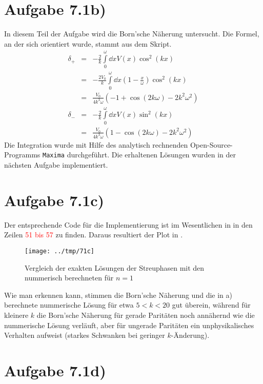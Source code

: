 \section*{Aufgabe 7.1b)}
In diesem Teil der Aufgabe wird die Born'sche Näherung untersucht. Die Formel, an
der sich orientiert wurde, stammt aus dem Skript.
\begin{eqnarray}
δ_+ &=& -\frac{2}{k}\int\limits_0^ω\dd{x}V(x)\cos^2(kx)\\
&=& -\frac{2 V_0}{k}\int\limits_0^ω\dd{x}(1-\frac{x}{ω})\cos^2(kx)\\
&=& \frac{V_0}{4k^3 ω} \left(-1 + \cos(2kω) - 2k^2 ω^2\right)\\
δ_- &=& -\frac{2}{k}\int\limits_0^ω\dd{x}V(x)\sin^2(kx)\\
&=& \frac{V_0}{4k^3 ω} \left(1 - \cos(2kω) - 2k^2 ω^2\right)
\end{eqnarray}
Die Integration wurde mit Hilfe des analytisch rechnenden Open-Source-Programms
\texttt{Maxima} durchgeführt. Die erhaltenen Lösungen wurden in der nächsten
Aufgabe implementiert.

\section*{Aufgabe 7.1c)}
Der entsprechende Code für die Implementierung ist im Wesentlichen in 
in den Zeilen \textcolor{red}{51 bis 57} zu finden. Daraus resultiert der Plot in .

\begin{figure}[htb]
  \centering
  \texttt{[image: ../tmp/71c]}
  \caption{Vergleich der exakten Lösungen der Streuphasen mit den nummerisch
  berechneten für $n=1$}
  \label{fig:1c}
\end{figure}

Wie man erkennen kann, stimmen die Born'sche Näherung und die in a) berechnete
nummerische Lösung für etwa $5<k<20$ gut überein, während für kleinere $k$ die
Born'sche Näherung für gerade Paritäten noch annähernd wie die nummerische Lösung
verläuft, aber für ungerade Paritäten ein unphysikalisches Verhalten aufweist (starkes
Schwanken bei geringer $k$-Änderung).

\section*{Aufgabe 7.1d)}